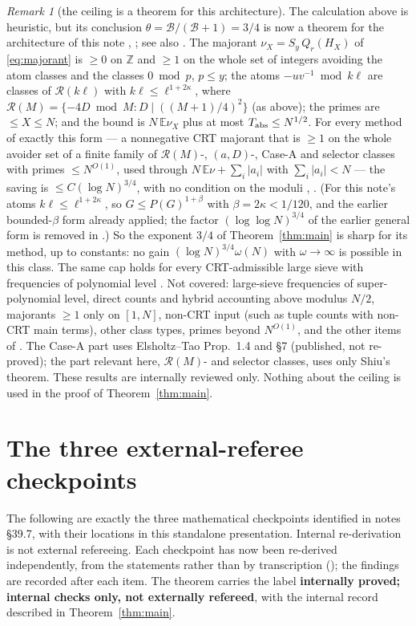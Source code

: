 \documentclass[10pt,reqno]{amsart}
\theoremstyle{remark}
\newtheorem{remark}[theorem]{Remark}
\newcommand{\E}{\mathbb E}
\begin{document}
\begin{remark}[the ceiling is a theorem for this architecture]
The calculation above is heuristic, but its conclusion
$\theta=\mathcal B/(\mathcal B+1)=3/4$ is now a theorem for the architecture
of this note \cite[Cor.~6.1, Remark~5.4]{KA2}, \cite[Cor.~4.2]{KA3}; see also
\cite[Theorem~10.14, Remark~10.15]{SL}.  The majorant
$\nu_X=S_y\,Q_r(H_X)$ of \eqref{eq:majorant} is $\geq0$ on $\mathbb Z$ and
$\geq1$ on the whole set of integers avoiding the atom classes and the
classes $0\bmod p$, $p\leq y$; the atoms $-uv^{-1}\bmod k\ell$ are classes of
$\mathcal R(k\ell)$ with $k\ell\leq\ell^{1+2\kappa}$, where
$\mathcal R(M)=\{-4D\bmod M:D\mid((M+1)/4)^2\}$ (as above); the primes are $\leq X\leq N$;
and the bound is $N\,\E\nu_X$ plus at most $T_{\rm abs}\leq N^{1/2}$.  For
every method of exactly this form --- a nonnegative CRT majorant that is
$\geq1$ on the whole avoider set of a finite family of $\mathcal R(M)$-,
$(a,D)$-, Case-A and selector classes with primes $\leq N^{O(1)}$, used
through $N\,\E\nu+\sum_i|a_i|$ with $\sum_i|a_i|<N$ --- the saving is
$\leq C(\log N)^{3/4}$, with no condition on the moduli \cite[Cor.~4.2]{KA3},
\cite[Theorem~10.14]{SL}.  (For this note's atoms $k\ell\leq\ell^{1+2\kappa}$, so
$G\leq P(G)^{1+\beta}$ with $\beta=2\kappa<1/120$, and the earlier bounded-$\beta$ form
\cite[Thm~5.2]{KA2} already applied; the factor $(\log\log N)^{3/4}$ of the
earlier general form is removed in \cite{KA3}.)  So the exponent $3/4$
of Theorem~\ref{thm:main} is sharp for its method, up to constants: no
gain $(\log N)^{3/4}\omega(N)$ with $\omega\to\infty$ is possible in this class.  The
same cap holds for every CRT-admissible large sieve with frequencies of
polynomial level \cite[Theorem~14.2]{SL}.  Not covered: large-sieve
frequencies of super-polynomial level, direct counts and hybrid
accounting above modulus $N/2$, majorants $\geq1$ only on $[1,N]$,
non-CRT input (such as tuple counts with non-CRT main terms), other class
types, primes beyond $N^{O(1)}$, and the other items of \cite[\S16]{SL}.  The Case-A part uses
Elsholtz--Tao Prop.~1.4 and \S7 (published, not re-proved); the part
relevant here, $\mathcal R(M)$- and selector classes, uses only Shiu's
theorem.  These results are internally
reviewed only.  Nothing about the ceiling is used in the proof of
Theorem~\ref{thm:main}.
\end{remark}

\section{The three external-referee checkpoints}\label{sec:checkpoints}
The following are exactly the three mathematical checkpoints identified
in notes \S39.7, with their locations in this standalone presentation.
Internal re-derivation is not external refereeing.  Each checkpoint has
now been re-derived independently, from the statements rather than by
transcription (\cite[\S76.4]{Notes}); the findings are recorded after
each item.  The theorem carries the label \textbf{internally proved;
internal checks only, not externally refereed}, with the internal
record described in Theorem~\ref{thm:main}.
\end{document}
